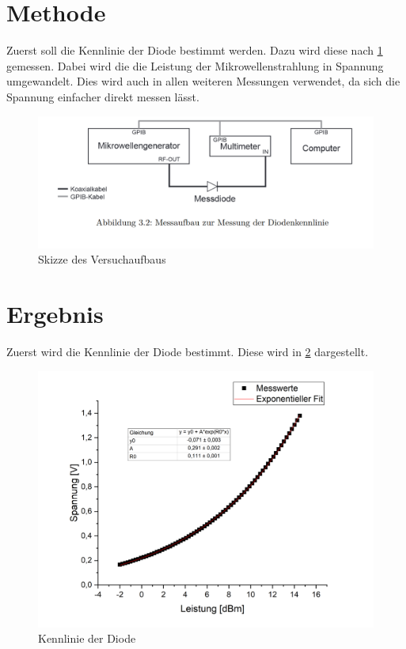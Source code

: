 \section{Methode}
Zuerst soll die Kennlinie der Diode bestimmt werden. Dazu wird diese nach \cref{Aufbau} gemessen. Dabei wird die die Leistung der Mikrowellenstrahlung in Spannung umgewandelt. Dies wird auch in allen weiteren Messungen verwendet, da sich die Spannung einfacher direkt messen lässt.


\begin{figure}[h]
	\centering
	\includegraphics[scale=0.4]{../Diode_Aufbau.PNG}
	\caption{Skizze des Versuchaufbaus}
	\label{Aufbau}
\end{figure}

\section{Ergebnis}
Zuerst wird die Kennlinie der Diode bestimmt. Diese wird in \cref{fuck_scidavis} dargestellt.

\begin{figure}[h]
	\centering
	\includegraphics[scale=0.3]{../fuck_scidavis.png}
	\caption{Kennlinie der Diode}
	\label{fuck_scidavis}
\end{figure}